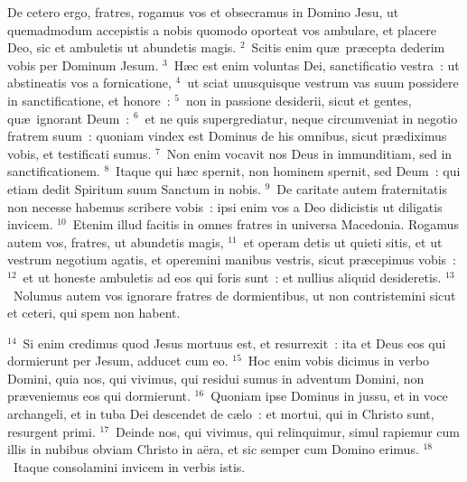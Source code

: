 \bchapter
\lettrine[lines=3,image=true,loversize=0.05,lraise=-0.03]{D}{}e cetero ergo, fratres, rogamus vos et obsecramus in Domino Jesu, ut quemadmodum accepistis a nobis quomodo oporteat vos ambulare, et placere Deo, sic et ambuletis ut abundetis magis.
${}^{2}$~Scitis enim qu\ae\ pr\ae cepta dederim vobis per Dominum Jesum.
${}^{3}$~H\ae c est enim voluntas Dei, sanctificatio vestra~: ut abstineatis vos a fornicatione,
${}^{4}$~ut sciat unusquisque vestrum vas suum possidere in sanctificatione, et honore~:
${}^{5}$~non in passione desiderii, sicut et gentes, qu\ae\ ignorant Deum~:
${}^{6}$~et ne quis supergrediatur, neque circumveniat in negotio fratrem suum~: quoniam vindex est Dominus de his omnibus, sicut pr\ae diximus vobis, et testificati sumus.
${}^{7}$~Non enim vocavit nos Deus in immunditiam, sed in sanctificationem.
${}^{8}$~Itaque qui h\ae c spernit, non hominem spernit, sed Deum~: qui etiam dedit Spiritum suum Sanctum in nobis.
${}^{9}$~De caritate autem fraternitatis non necesse habemus scribere vobis~: ipsi enim vos a Deo didicistis ut diligatis invicem.
${}^{10}$~Etenim illud facitis in omnes fratres in universa Macedonia. Rogamus autem vos, fratres, ut abundetis magis,
${}^{11}$~et operam detis ut quieti sitis, et ut vestrum negotium agatis, et operemini manibus vestris, sicut pr\ae cepimus vobis~:
${}^{12}$~et ut honeste ambuletis ad eos qui foris sunt~: et nullius aliquid desideretis.
${}^{13}$~Nolumus autem vos ignorare fratres de dormientibus, ut non contristemini sicut et ceteri, qui spem non habent.


${}^{14}$~Si enim credimus quod Jesus mortuus est, et resurrexit~: ita et Deus eos qui dormierunt per Jesum, adducet cum eo.
${}^{15}$~Hoc enim vobis dicimus in verbo Domini, quia nos, qui vivimus, qui residui sumus in adventum Domini, non pr\ae veniemus eos qui dormierunt.
${}^{16}$~Quoniam ipse Dominus in jussu, et in voce archangeli, et in tuba Dei descendet de c\ae lo~: et mortui, qui in Christo sunt, resurgent primi.
${}^{17}$~Deinde nos, qui vivimus, qui relinquimur, simul rapiemur cum illis in nubibus obviam Christo in a\"era, et sic semper cum Domino erimus.
${}^{18}$~Itaque consolamini invicem in verbis istis.

